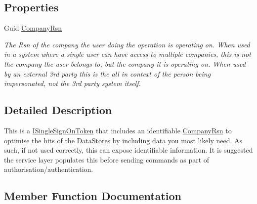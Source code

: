 \subsection*{Properties}
\begin{DoxyCompactItemize}
\item 
Guid \hyperlink{classCqrs_1_1Authentication_1_1SingleSignOnTokenWithCompanyRsn_abb327084c1ff87de84c92008b4437675_abb327084c1ff87de84c92008b4437675}{Company\+Rsn}
\begin{DoxyCompactList}\small\item\em The Rsn of the company the user doing the operation is operating on. When used in a system where a single user can have access to multiple companies, this is not the company the user belongs to, but the company it is operating on. When used by an external 3rd party this is the all in context of the person being impersonated, not the 3rd party system itself. \end{DoxyCompactList}\end{DoxyCompactItemize}


\subsection{Detailed Description}
This is a \hyperlink{interfaceCqrs_1_1Authentication_1_1ISingleSignOnToken}{I\+Single\+Sign\+On\+Token} that includes an identifiable \hyperlink{classCqrs_1_1Authentication_1_1SingleSignOnTokenWithCompanyRsn_abb327084c1ff87de84c92008b4437675_abb327084c1ff87de84c92008b4437675}{Company\+Rsn} to optimise the hits of the \hyperlink{}{Data\+Stores} by including data you most likely need. As such, if not used correctly, this can expose identifiable information. It is suggested the service layer populates this before sending commands as part of authorisation/authentication. 



\subsection{Member Function Documentation}
\mbox{\label{classCqrs_1_1Authentication_1_1SingleSignOnTokenWithCompanyRsn_a0bc9f0fae90121d029fe0730708f4210_a0bc9f0fae90121d029fe0730708f4210}} 
